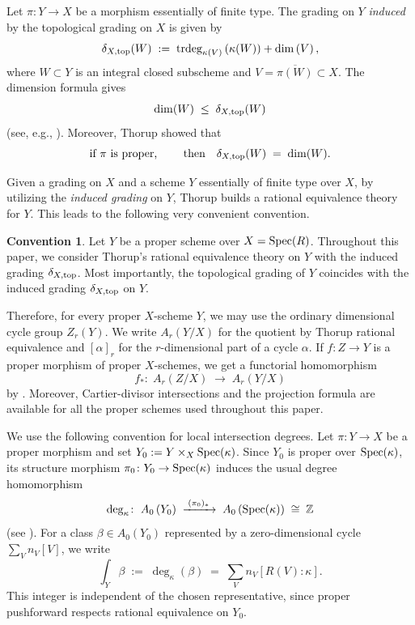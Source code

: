 \documentclass[a4paper, 11pt]{amsart}
\newcommand{\ZZ}{\mathbb{Z}}
\newcommand{\Spec}{\normalfont\text{Spec}}
\theoremstyle{definition}
\newtheorem{convention}[convention]{Convention}
\def\trdeg{{\rm trdeg}}
\begin{document}
	
	Let $\pi \colon Y\to X$ be a morphism essentially of finite type.
	The grading on $Y$ \emph{induced} by the topological grading on $X$ is given by
	$$
	\delta_{X, \rm top}(W) \;:=\; \trdeg_{\kappa(V)}\left(\kappa(W)\right) +\dim\left(V\right),
	$$
	where $W\subset Y$ is
	an integral closed subscheme and $V=\overline{\pi(W)} \subset X$.  
	The dimension formula gives 
	$$
	\dim(W) \;\leq\; \delta_{X, \rm top}(W)
	$$ 
	(see, e.g.,
	\cite[Theorem~15.5]{MatCRT}). 
	Moreover, Thorup \cite[Proposition~4.3]{Thorup} showed that
	$$
	\text{if $\pi$ is proper, \qquad then} \quad  \delta_{X, \rm top}(W) \;=\; \dim(W).
	$$
	
	
	Given a grading on $X$ and a scheme $Y$ essentially of finite type over $X$, by utilizing the \emph{induced grading} on $Y$, Thorup builds a rational equivalence theory for $Y$.
	This leads to the following very convenient  convention. 
	
	\begin{convention}
		Let $Y$ be a proper scheme over $X = \Spec(R)$.
		Throughout this paper, we consider Thorup's rational equivalence theory on $Y$ with the induced grading $\delta_{X, \rm top}$.
		Most importantly, the topological grading of $Y$ coincides with the induced grading $\delta_{X, \rm top}$ on $Y$.
	\end{convention} 
	
	
	
	Therefore, for every proper $X$-scheme $Y$, we may use the ordinary dimensional cycle group $Z_r(Y)$.  
	We write $A_r(Y/X)$ for the quotient by Thorup rational equivalence and $[\alpha]_r$ for the $r$-dimensional part of a cycle $\alpha$.  
	If $f : Z \rightarrow Y$ is a proper morphism of proper $X$-schemes, we get a functorial homomorphism
	$$
	f_*\colon \; A_r(Z/X) \;\longrightarrow\; A_r(Y/X)
	$$
	by \cite[Proposition~6.5]{Thorup}. 
	Moreover, Cartier-divisor intersections and the	projection formula are available for all the proper schemes used	throughout this paper.
	
	We use the following convention for local intersection degrees.
	Let $\pi\colon Y\to X$ be a proper morphism and set $Y_0:=Y\times_X\Spec(\kappa)$.
	Since $Y_0$ is proper over $\Spec(\kappa)$, its structure morphism $\pi_0\colon Y_0\to\Spec(\kappa)$ induces the usual degree homomorphism
	$$
	\deg_\kappa\colon\; A_0\left(Y_0\right) \;\xrightarrow{\;(\pi_0)_*\;}\; A_0\left(\Spec(\kappa)\right) \;\cong\; \ZZ
	$$
	(see \cite[Definition~1.4]{Fu}).
	For a class $\beta\in A_0(Y_0)$ represented by a zero-dimensional cycle $\sum_V n_V[V]$, we write
	$$
	\int_Y\beta \;:=\; \deg_\kappa(\beta)
	\;=\; \sum_V n_V\left[R(V):\kappa\right].
	$$
	This integer is independent of the chosen representative, since proper pushforward respects rational equivalence on $Y_0$.
	
\end{document}
